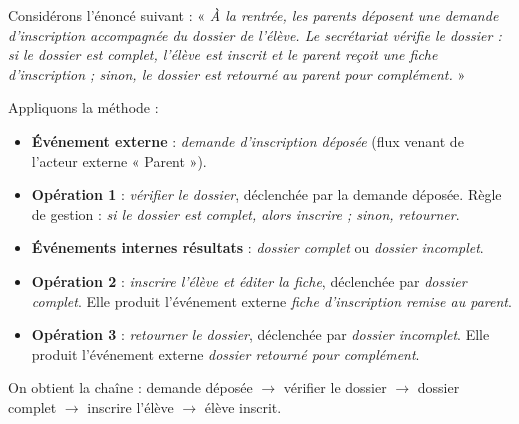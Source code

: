 \documentclass[11pt]{article}
\begin{document}
\begin{exemplebox}
Considérons l'énoncé suivant : « \emph{À la rentrée, les parents déposent une demande d'inscription accompagnée du dossier de l'élève. Le secrétariat vérifie le dossier : si le dossier est complet, l'élève est inscrit et le parent reçoit une fiche d'inscription ; sinon, le dossier est retourné au parent pour complément.} »

Appliquons la méthode :
\begin{itemize}
\item \textbf{Événement externe} : \emph{demande d'inscription déposée} (flux venant de l'acteur externe « Parent »).
\item \textbf{Opération 1} : \emph{vérifier le dossier}, déclenchée par la demande déposée. Règle de gestion : \emph{si le dossier est complet, alors inscrire ; sinon, retourner}.
\item \textbf{Événements internes résultats} : \emph{dossier complet} ou \emph{dossier incomplet}.
\item \textbf{Opération 2} : \emph{inscrire l'élève et éditer la fiche}, déclenchée par \emph{dossier complet}. Elle produit l'événement externe \emph{fiche d'inscription remise au parent}.
\item \textbf{Opération 3} : \emph{retourner le dossier}, déclenchée par \emph{dossier incomplet}. Elle produit l'événement externe \emph{dossier retourné pour complément}.
\end{itemize}
On obtient la chaîne : demande déposée $\rightarrow$ vérifier le dossier $\rightarrow$ dossier complet $\rightarrow$ inscrire l'élève $\rightarrow$ élève inscrit.
\end{exemplebox}
\end{document}
